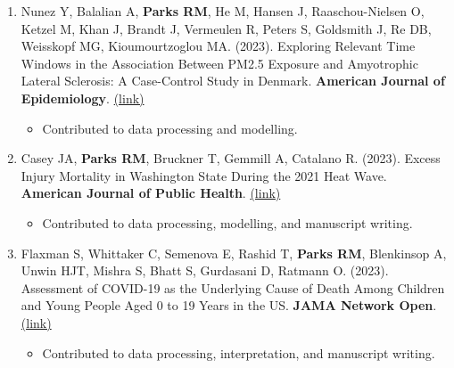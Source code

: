 \begin{enumerate}
    \item Nunez Y, Balalian A, \textbf{Parks RM}, He M, Hansen J, Raaschou-Nielsen O, Ketzel M, Khan J, Brandt J, Vermeulen R, Peters S, Goldsmith J, Re DB, Weisskopf MG, Kioumourtzoglou MA. (2023). Exploring Relevant Time Windows in the Association Between PM2.5 Exposure and Amyotrophic Lateral Sclerosis: A Case-Control Study in Denmark. \textbf{American Journal of Epidemiology}. \href{https://academic.oup.com/aje/advance-article-abstract/doi/10.1093/aje/kwad099/7135818?redirectedFrom=fulltext&login=false}{(link)}

    \begin{itemize}
        \item Contributed to data processing and modelling.
    \end{itemize}

     \item \noindent Casey JA, \textbf{Parks RM}, Bruckner T, Gemmill A, Catalano R. (2023). Excess Injury Mortality in Washington State During the 2021 Heat Wave. \textbf{American Journal of Public Health}. \href{https://ajph.aphapublications.org/doi/abs/10.2105/AJPH.2023.307269}{(link)}

    \begin{itemize}
        \item Contributed to data processing, modelling, and manuscript writing.
    \end{itemize}

    \item Flaxman S, Whittaker C, Semenova E, Rashid T, \textbf{Parks RM}, Blenkinsop A, Unwin HJT, Mishra S, Bhatt S, Gurdasani D, Ratmann O. (2023). Assessment of COVID-19 as the Underlying Cause of Death Among Children and Young People Aged 0 to 19 Years in the US. \textbf{JAMA Network Open}. \href{https://jamanetwork.com/journals/jamanetworkopen/fullarticle/2800816}{(link)}

    \begin{itemize}
        \item Contributed to data processing, interpretation, and manuscript writing.
    \end{itemize}


\end{enumerate}
